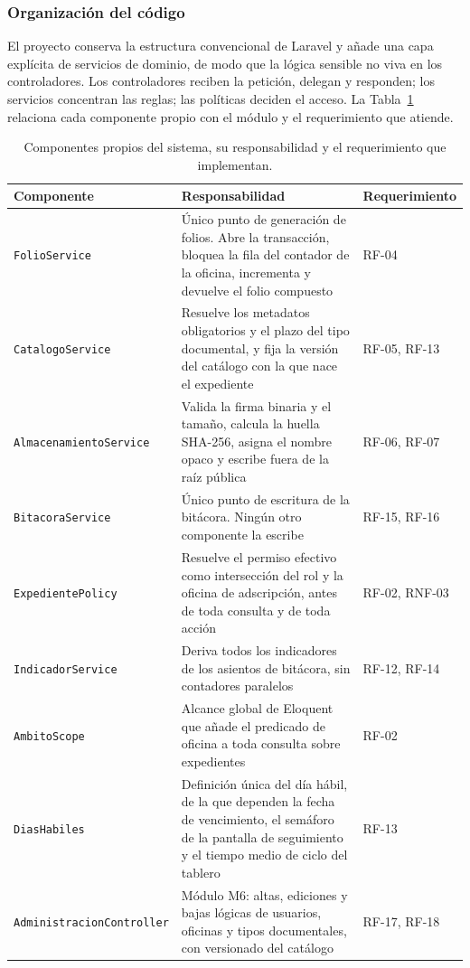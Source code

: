 \subsubsection*{Organización del código}

El proyecto conserva la estructura convencional de Laravel y añade una capa explícita de servicios de dominio, de modo que la lógica sensible no viva en los controladores. Los controladores reciben la petición, delegan y responden; los servicios concentran las reglas; las políticas deciden el acceso. La Tabla~\ref{tab:componentes} relaciona cada componente propio con el módulo y el requerimiento que atiende.

\begin{table}[H]
  \centering
  \small
  \renewcommand{\arraystretch}{1.3}
  \caption{Componentes propios del sistema, su responsabilidad y el requerimiento que implementan.}
  \label{tab:componentes}
  \begin{tabularx}{\textwidth}{@{}>{\raggedright\arraybackslash}p{3.7cm}>{\raggedright\arraybackslash}X>{\raggedright\arraybackslash}p{2.5cm}@{}}
    \toprule
    \textbf{Componente} & \textbf{Responsabilidad} & \textbf{Requerimiento} \\
    \midrule
    \texttt{FolioService} & Único punto de generación de folios. Abre la transacción, bloquea la fila del contador de la oficina, incrementa y devuelve el folio compuesto & RF-04 \\
    \texttt{CatalogoService} & Resuelve los metadatos obligatorios y el plazo del tipo documental, y fija la versión del catálogo con la que nace el expediente & RF-05, RF-13 \\
    \texttt{Almacenamien\-to\-Service} & Valida la firma binaria y el tamaño, calcula la huella SHA-256, asigna el nombre opaco y escribe fuera de la raíz pública & RF-06, RF-07 \\
    \texttt{BitacoraService} & Único punto de escritura de la bitácora. Ningún otro componente la escribe & RF-15, RF-16 \\
    \texttt{ExpedientePolicy} & Resuelve el permiso efectivo como intersección del rol y la oficina de adscripción, antes de toda consulta y de toda acción & RF-02, RNF-03 \\
    \texttt{IndicadorService} & Deriva todos los indicadores de los asientos de bitácora, sin contadores paralelos & RF-12, RF-14 \\
    \texttt{AmbitoScope} & Alcance global de Eloquent que añade el predicado de oficina a toda consulta sobre expedientes & RF-02 \\
    \texttt{DiasHabiles} & Definición única del día hábil, de la que dependen la fecha de vencimiento, el semáforo de la pantalla de seguimiento y el tiempo medio de ciclo del tablero & RF-13 \\
    \texttt{Administracion\-Con\-troller} & Módulo M6: altas, ediciones y bajas lógicas de usuarios, oficinas y tipos documentales, con versionado del catálogo & RF-17, RF-18 \\
    \bottomrule
  \end{tabularx}
\end{table}

